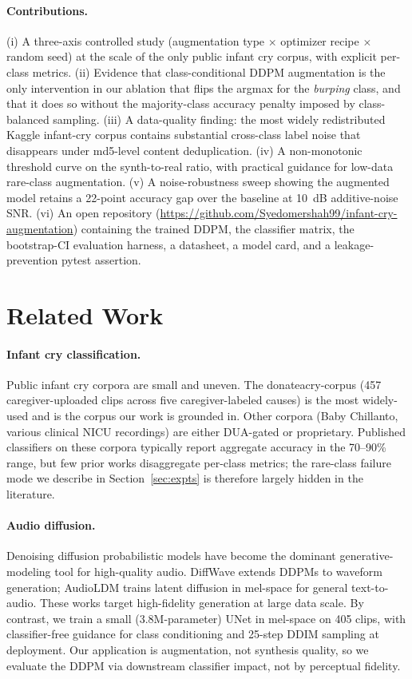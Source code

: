 \documentclass[10pt]{article}
\begin{document}
\paragraph{Contributions.}
(i) A three-axis controlled study (augmentation type $\times$ optimizer recipe $\times$ random seed) at the scale of the only public infant cry corpus, with explicit per-class metrics. (ii) Evidence that class-conditional DDPM augmentation is the only intervention in our ablation that flips the argmax for the \textit{burping} class, and that it does so without the majority-class accuracy penalty imposed by class-balanced sampling. (iii) A data-quality finding: the most widely redistributed Kaggle infant-cry corpus contains substantial cross-class label noise that disappears under md5-level content deduplication. (iv) A non-monotonic threshold curve on the synth-to-real ratio, with practical guidance for low-data rare-class augmentation. (v) A noise-robustness sweep showing the augmented model retains a 22-point accuracy gap over the baseline at 10~dB additive-noise SNR. (vi) An open repository (\url{https://github.com/Syedomershah99/infant-cry-augmentation}) containing the trained DDPM, the classifier matrix, the bootstrap-CI evaluation harness, a datasheet, a model card, and a leakage-prevention pytest assertion.

\section{Related Work}\label{sec:past}

\paragraph{Infant cry classification.} Public infant cry corpora are small and uneven. The donateacry-corpus \citep{donateacry} (457 caregiver-uploaded clips across five caregiver-labeled causes) is the most widely-used and is the corpus our work is grounded in. Other corpora (Baby Chillanto, various clinical NICU recordings) are either DUA-gated or proprietary. Published classifiers on these corpora typically report aggregate accuracy in the 70--90\% range, but few prior works disaggregate per-class metrics; the rare-class failure mode we describe in Section~\ref{sec:expts} is therefore largely hidden in the literature.

\paragraph{Audio diffusion.} Denoising diffusion probabilistic models \citep{ho2020denoising} have become the dominant generative-modeling tool for high-quality audio. DiffWave \citep{kong2021diffwave} extends DDPMs to waveform generation; AudioLDM \citep{liu2023audioldm} trains latent diffusion in mel-space for general text-to-audio. These works target high-fidelity generation at large data scale. By contrast, we train a small (3.8M-parameter) UNet in mel-space on 405 clips, with classifier-free guidance \citep{ho2021classifier} for class conditioning and 25-step DDIM \citep{song2021ddim} sampling at deployment. Our application is augmentation, not synthesis quality, so we evaluate the DDPM via downstream classifier impact, not by perceptual fidelity.
\end{document}
